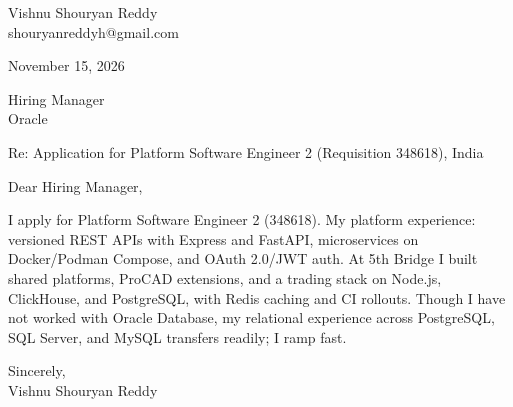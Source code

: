 \documentclass[a4paper,11pt]{article}
\begin{document}
\pagestyle{empty}
Vishnu Shouryan Reddy \\
shouryanreddyh@gmail.com

\vspace{1em}
November 15, 2026

\vspace{1em}
Hiring Manager \\
Oracle

\vspace{1em}
Re: Application for Platform Software Engineer 2 (Requisition 348618), India

\vspace{1em}
Dear Hiring Manager,

\vspace{0.5em}
I apply for Platform Software Engineer 2 (348618). My platform experience: versioned REST APIs with Express and FastAPI, microservices on Docker/Podman Compose, and OAuth 2.0/JWT auth. At 5th Bridge I built shared platforms, ProCAD extensions, and a trading stack on Node.js, ClickHouse, and PostgreSQL, with Redis caching and CI rollouts. Though I have not worked with Oracle Database, my relational experience across PostgreSQL, SQL Server, and MySQL transfers readily; I ramp fast.

\vspace{1em}
Sincerely, \\
Vishnu Shouryan Reddy
\end{document}

